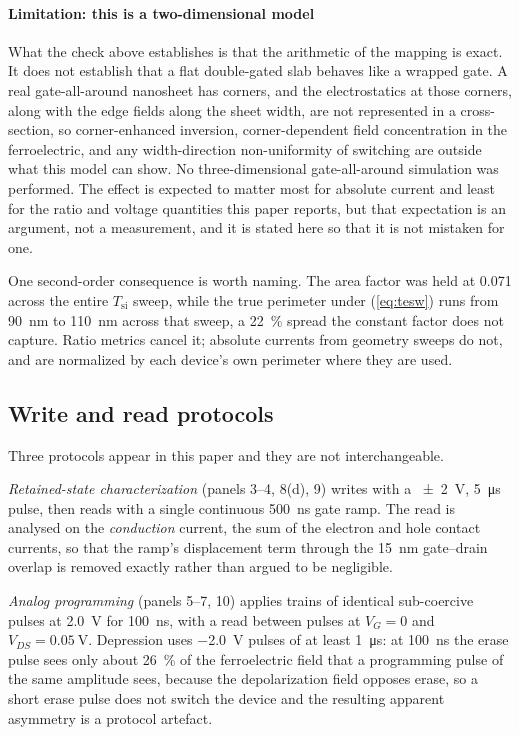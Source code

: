 \paragraph*{Limitation: this is a two-dimensional model}
What the check above establishes is that the arithmetic of the mapping is exact. It does
not establish that a flat double-gated slab behaves like a wrapped gate. A real
gate-all-around nanosheet has corners, and the electrostatics at those corners, along with
the edge fields along the sheet width, are not represented in a cross-section, so
corner-enhanced inversion, corner-dependent field concentration in the ferroelectric,
and any width-direction non-uniformity of switching are outside what this model can
show. No three-dimensional gate-all-around simulation was performed. The effect is
expected to matter most for absolute current and least for the ratio and voltage
quantities this paper reports, but that expectation is an argument, not a measurement,
and it is stated here so that it is not mistaken for one.

One second-order consequence is worth naming. The area factor was held at
\num{0.071} across the entire $T_\mathrm{si}$ sweep, while the true perimeter under
(\ref{eq:tesw}) runs from \SI{90}{\nano\metre} to \SI{110}{\nano\metre} across that
sweep, a \SI{22}{\percent} spread the constant factor does not capture. Ratio metrics
cancel it; absolute currents from geometry sweeps do not, and are normalized by each
device's own perimeter where they are used.

\subsection{Write and read protocols}

Three protocols appear in this paper and they are not interchangeable.

\emph{Retained-state characterization} (panels 3--4, 8(d), 9) writes with a
\SI{\pm2}{\volt}, \SI{5}{\micro\second} pulse, then reads with a single continuous
\SI{500}{\nano\second} gate ramp. The read is analysed on the \emph{conduction} current,
the sum of the electron and hole contact currents, so that the ramp's displacement term
through the \SI{15}{\nano\metre} gate--drain overlap is removed exactly rather than
argued to be negligible.

\emph{Analog programming} (panels 5--7, 10) applies trains of identical sub-coercive
pulses at \SI{2.0}{\volt} for \SI{100}{\nano\second}, with a read between pulses at
$V_G=0$ and $V_{DS}=\SI{0.05}{\volt}$. Depression uses \SI{-2.0}{\volt} pulses of at
least \SI{1}{\micro\second}: at \SI{100}{\nano\second} the erase pulse sees only about
\SI{26}{\percent} of the ferroelectric field that a programming pulse of the same
amplitude sees, because the depolarization field opposes erase, so a short erase pulse
does not switch the device and the resulting apparent asymmetry is a protocol artefact.

